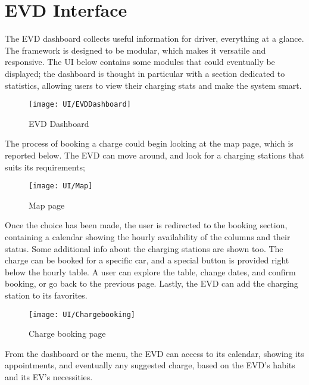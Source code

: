 \section{EVD Interface}
\label{sec: evd_interface}%
The EVD dashboard collects useful information for driver, everything at a glance.
The framework is designed to be modular, which makes it versatile and responsive.
The UI below contains some modules that could eventually be displayed;
the dashboard is thought in particular with a section dedicated to statistics, allowing users to view their charging stats and make the system smart.

\begin{figure} [H]
    \begin{center}
        \texttt{[image: UI/EVDDashboard]}
        \caption{EVD Dashboard}
        \label{fig: evddashboard}
    \end{center}
\end{figure}

The process of booking a charge could begin looking at the map page, which is reported below.
The EVD can move around, and look for a charging stations that suits its requirements;

\begin{figure} [H]
    \begin{center}
        \texttt{[image: UI/Map]}
        \caption{Map page}
        \label{fig: map}
    \end{center}
\end{figure}

Once the choice has been made, the user is redirected to the booking section, containing a calendar showing the hourly availability of the columns and their status.
Some additional info about the charging stations are shown too.
The charge can be booked for a specific car, and a special button is provided right below the hourly table.
A user can explore the table, change dates, and confirm booking, or go back to the previous page.
Lastly, the EVD can add the charging station to its favorites.

\begin{figure} [H]
    \begin{center}
        \texttt{[image: UI/Chargebooking]}
        \caption{Charge booking page}
        \label{fig: chargebooking}
    \end{center}
\end{figure}

From the dashboard or the menu, the EVD can access to its calendar, showing its appointments, and eventually any suggested charge, based on the EVD’s habits and its EV’s necessities.

